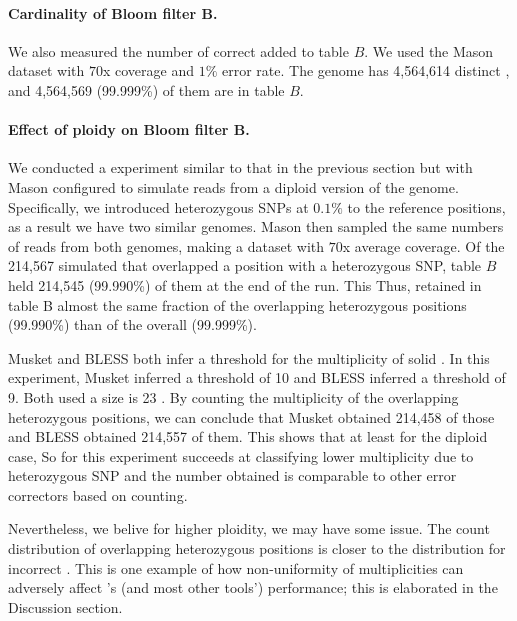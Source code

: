 \documentclass{bmcart}
\begin{document}
\paragraph{Cardinality of Bloom filter B.}  We also measured the number of correct \kmers added to table $B$. We used the Mason dataset with $70$x coverage and $1\%$ error rate. The \ecoli genome has 4,564,614 distinct \kmers, and 4,564,569 (99.999\%) of them are in table $B$.  

\paragraph{Effect of ploidy on Bloom filter B.}  We conducted a experiment similar to that in the previous section but with Mason configured to simulate reads from a diploid version of the \ecoli genome.
Specifically, we introduced heterozygous SNPs at $0.1\%$ to the reference positions, as a result we have two similar genomes.
Mason then sampled the same numbers of reads from both genomes, making a dataset with $70$x average coverage.
Of the 214,567 simulated \kmers that overlapped a position with a heterozygous SNP, table $B$ held 214,545 (99.990\%) of them at the end of the run. This
Thus, \tool retained in table B almost the same fraction of the \kmers overlapping heterozygous positions (99.990\%) than of the \kmers overall (99.999\%).

Musket and BLESS both infer a threshold for the multiplicity of solid \kmers. In this experiment, Musket inferred a threshold of 10 and BLESS inferred a threshold of 9.
Both used a \kmer size is 23 .
By counting the multiplicity of the \kmers overlapping heterozygous positions, we can conclude that Musket obtained 214,458 of those \kmers and BLESS obtained 214,557 of them. This shows that at least for the diploid case,
So for this experiment \tool succeeds at classifying lower multiplicity due to heterozygous SNP and the number \tool obtained is comparable to other error correctors based on counting.

Nevertheless, we belive for higher ploidity, we may have some issue. 
The count distribution of \kmers overlapping heterozygous positions is closer to the distribution for incorrect \kmers.
This is one example of how non-uniformity of \kmer multiplicities can adversely affect \tool's (and most other tools') performance; this is elaborated in the Discussion section.
\end{document}
